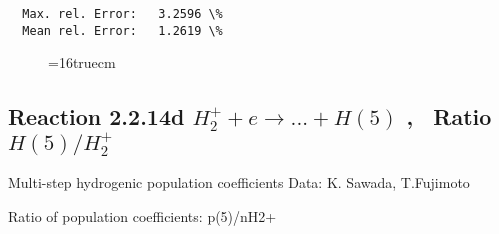 \documentclass[12pt,dvipdfmx]{article}
\begin{document}
\begin{small}
\begin{verbatim}
  Max. rel. Error:   3.2596 \%
  Mean rel. Error:   1.2619 \%

\end{verbatim}\end{small}
\begin{figure} \label{2.2.14c}
\epsfxsize=16truecm
\end{figure}
\newpage


\subsection{
Reaction 2.2.14d $ H_2^+ + e \rightarrow ...+ H(5) $ , \   Ratio $H(5)/H_2^+  $
}

 Multi-step hydrogenic population coefficients
 Data: K. Sawada, T.Fujimoto \cite{kn:Sawada}

 Ratio of population coefficients: p(5)/nH2+
\end{document}
